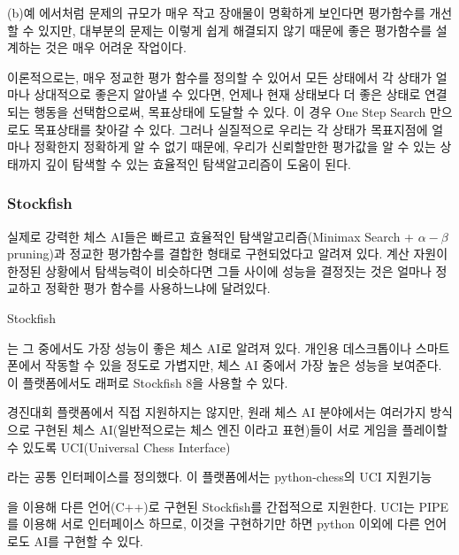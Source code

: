 \documentclass[letterpaper,10pt,english]{sphinxmanual}
\begin{document}
{\hyperref[\detokenize{03-basic_ai_examples:path-finding}]{}} (b)예 에서처럼 문제의 규모가 매우 작고 장애물이 명확하게 보인다면
평가함수를 개선할 수 있지만, 대부분의 문제는 이렇게 쉽게 해결되지 않기 때문에
좋은 평가함수를 설계하는 것은 매우 어려운 작업이다.

이론적으로는, 매우 정교한 평가 함수를 정의할 수 있어서 모든 상태에서 각 상태가 얼마나 상대적으로 좋은지 알아낼 수 있다면,
언제나 현재 상태보다 더 좋은 상태로 연결되는 행동을 선택함으로써, 목표상태에 도달할 수 있다.
이 경우 One Step Search 만으로도 목표상태를 찾아갈 수 있다. 그러나 실질적으로 우리는 각 상태가 목표지점에 얼마나 정확한지
정확하게 알 수 없기 때문에, 우리가 신뢰할만한 평가값을 알 수 있는 상태까지 깊이 탐색할 수 있는 효율적인 탐색알고리즘이 도움이 된다.


\subsubsection{Stockfish}
\label{\detokenize{03-basic_ai_examples:stockfish}}
실제로 강력한 체스 AI들은 빠르고 효율적인 탐색알고리즘(Minimax Search + \(\alpha-\beta\) pruning)과
정교한 평가함수를 결합한 형태로 구현되었다고 알려져 있다. 계산 자원이 한정된 상황에서 탐색능력이 비슷하다면
그들 사이에 성능을 결정짓는 것은 얼마나 정교하고 정확한 평가 함수를 사용하느냐에 달려있다.

Stockfish %
\begin{footnote}[9]\sphinxAtStartFootnote
{}
%
\end{footnote} 는 그 중에서도 가장 성능이 좋은 체스 AI로 알려져 있다.
개인용 데스크톱이나 스마트폰에서 작동할 수 있을 정도로 가볍지만, 체스 AI 중에서 가장 높은 성능을 보여준다.
이 플랫폼에서도 {\hyperref[\detokenize{agents.stockfish:agents.stockfish.agent.Stockfish}]{}} 래퍼로 Stockfish 8을 사용할 수 있다.

경진대회 플랫폼에서 직접 지원하지는 않지만,
원래 체스 AI 분야에서는 여러가지 방식으로 구현된 체스 AI(일반적으로는 체스 엔진 이라고 표현)들이
서로 게임을 플레이할 수 있도록 UCI(Universal Chess Interface) %
\begin{footnote}[10]\sphinxAtStartFootnote
{}
%
\end{footnote} 라는 공통 인터페이스를 정의했다.
이 플랫폼에서는 python-chess의 UCI 지원기능 %
\begin{footnote}[11]\sphinxAtStartFootnote
{}
%
\end{footnote} 을 이용해 다른 언어(C++)로 구현된 Stockfish를 간접적으로 지원한다.
UCI는 PIPE를 이용해 서로 인터페이스 하므로, 이것을 구현하기만 하면 python 이외에 다른 언어로도 AI를 구현할 수 있다.
\end{document}
